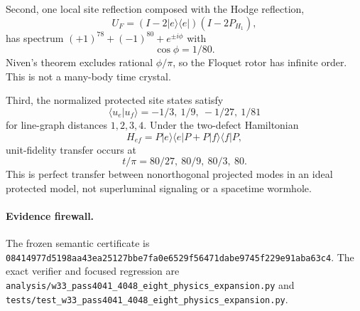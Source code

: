 Second, one local site reflection composed with the Hodge reflection,
\[
 U_F=(I-2|e\rangle\langle e|)(I-2P_{H_1}),
\]
has spectrum $(+1)^{78}+(-1)^{80}+e^{\pm i\phi}$ with
\[
 \boxed{\cos\phi=1/80}.
\]
Niven's theorem excludes rational $\phi/\pi$, so the Floquet rotor has infinite order.  This is not a many-body time crystal.

Third, the normalized protected site states satisfy
\[
 \langle u_e|u_f\rangle=-1/3,\ 1/9,\ -1/27,\ 1/81
\]
for line-graph distances $1,2,3,4$.  Under the two-defect Hamiltonian
\[
 H_{ef}=P|e\rangle\langle e|P+P|f\rangle\langle f|P,
\]
unit-fidelity transfer occurs at
\[
 \boxed{t/\pi=80/27,\ 80/9,\ 80/3,\ 80}.
\]
This is perfect transfer between nonorthogonal projected modes in an ideal protected model, not superluminal signaling or a spacetime wormhole.

\paragraph{Evidence firewall.}
The frozen semantic certificate is
\texttt{08414977d5198aa43ea25127bbe7fa0e6529f56471dabe9745f229e91aba63c4}.
The exact verifier and focused regression are
\texttt{analysis/w33\_pass4041\_4048\_eight\_physics\_expansion.py}
and
\texttt{tests/test\_w33\_pass4041\_4048\_eight\_physics\_expansion.py}.
